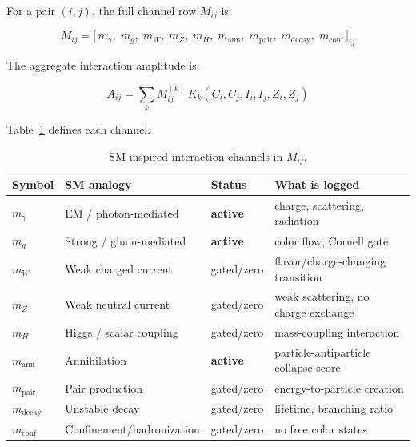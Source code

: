 \documentclass[11pt,a4paper]{article}
\theoremstyle{defbox}
\begin{document}
For a pair $(i,j)$, the full channel row $M_{ij}$ is:

\begin{equation}
  M_{ij} = \bigl[\,
	m_\gamma,\;
	m_g,\;
	m_W,\;
	m_Z,\;
	m_H,\;
	m_{\mathrm{ann}},\;
	m_{\mathrm{pair}},\;
	m_{\mathrm{decay}},\;
	m_{\mathrm{conf}}
  \,\bigr]_{ij}
\end{equation}

The aggregate interaction amplitude is:

\begin{equation}
  A_{ij} = \sum_k M_{ij}^{(k)}\,K_k\!\left(C_i, C_j, I_i, I_j, Z_i, Z_j\right)
\end{equation}

Table~\ref{tab:channels} defines each channel.

\begin{table}[ht]
\centering
\caption{SM-inspired interaction channels in $M_{ij}$.}
\label{tab:channels}
\renewcommand{\arraystretch}{1.25}
\begin{tabular}{llll}
\toprule
\textbf{Symbol} & \textbf{SM analogy} & \textbf{Status} & \textbf{What is logged} \\
\midrule
$m_\gamma$              & EM / photon-mediated       & \textbf{active}  & charge, scattering, radiation \\
$m_g$                   & Strong / gluon-mediated    & \textbf{active}  & color flow, Cornell gate \\
$m_W$                   & Weak charged current       & gated/zero       & flavor/charge-changing transition \\
$m_Z$                   & Weak neutral current       & gated/zero       & weak scattering, no charge exchange \\
$m_H$                   & Higgs / scalar coupling    & gated/zero       & mass-coupling interaction \\
$m_{\mathrm{ann}}$      & Annihilation               & \textbf{active}  & particle-antiparticle collapse score \\
$m_{\mathrm{pair}}$     & Pair production            & gated/zero       & energy-to-particle creation \\
$m_{\mathrm{decay}}$    & Unstable decay             & gated/zero       & lifetime, branching ratio \\
$m_{\mathrm{conf}}$     & Confinement/hadronization  & gated/zero       & no free color states \\
\bottomrule
\end{tabular}
\end{table}
\end{document}
